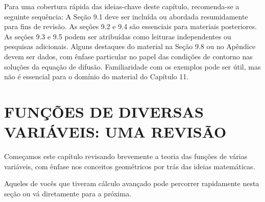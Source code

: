 {{Para uma cobertura rápida das ideias-chave deste capítulo, recomenda-se a seguinte sequência: A Seção 9.1 deve ser incluída ou abordada resumidamente para fins de revisão. As seções 9.2 e 9.4 são essenciais para materiais posteriores. As seções 9.3 e 9.5 podem ser atribuídas como leituras independentes ou pesquisas adicionais. Alguns destaques do material na Seção 9.8 ou no Apêndice devem ser dados, com ênfase particular no papel das condições de contorno nas soluções da equação de difusão. Familiaridade com os exemplos pode ser útil, mas não é essencial para o domínio do material do Capítulo 11.}}



{{\section{FUNÇÕES DE DIVERSAS VARIÁVEIS: UMA REVISÃO}}}


{{Começamos este capítulo revisando brevemente a teoria das funções de várias variáveis, com ênfase nos conceitos geométricos por trás das ideias matemáticas.}}


Aqueles de vocês que tiveram cálculo avançado pode percorrer rapidamente nesta seção ou vá diretamente para a próxima.


